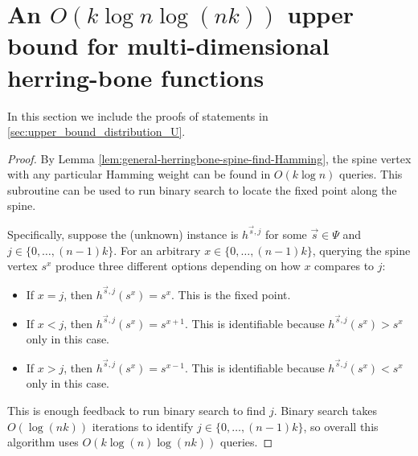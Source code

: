 \documentclass[11pt]{article}
\begin{document}
\section{An $O(k \log n \log(nk))$ upper bound for multi-dimensional herring-bone functions} \label{app:upper_bound_distribution_U}

In this section we include the proofs of statements in  \cref{sec:upper_bound_distribution_U}.

\theoremherringboneupperbound*

\begin{proof}
    By Lemma \ref{lem:general-herringbone-spine-find-Hamming}, the spine vertex with any particular Hamming weight can be found in $O(k \log n)$ queries. This subroutine can be used to run binary search to locate the fixed point along the spine.

    Specifically, suppose the (unknown) instance is $h^{\vec{s}, j}$ for some $\vec{s} \in \Psi$ and $j \in \{0, \ldots, (n-1)k\}$. For an arbitrary $x \in \{0, \ldots, (n-1)k\}$, querying the spine vertex $s^x$ produce three different options depending on how $x$ compares to $j$:
    \begin{itemize}
        \item If $x=j$, then $h^{\vec{s}, j}(s^x) = s^x$. This is the fixed point.
        \item If $x < j$, then $h^{\vec{s}, j}(s^x) = s^{x+1}$. This is identifiable because $h^{\vec{s}, j}(s^x) > s^x$ only in this case.
        \item If $x > j$, then $h^{\vec{s}, j}(s^x) = s^{x-1}$. This is identifiable because $h^{\vec{s}, j}(s^x) < s^x$ only in this case.
    \end{itemize}
    This is enough feedback to run binary search to find $j$. Binary search takes $O(\log (nk))$ iterations to identify $j \in \{0, \ldots, (n-1)k\}$, so overall this algorithm uses $O(k \log(n) \log(nk))$ queries.
\end{proof}
\end{document}
